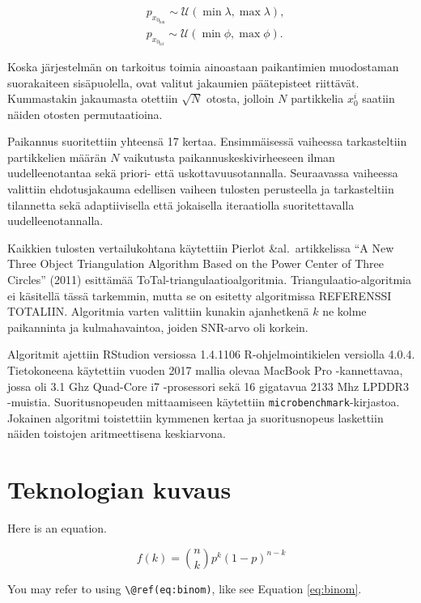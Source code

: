 \documentclass[
  12pt,
  a4paper, twoside]{book}
\begin{document}
\begin{align}
&p_{x_{0_{\text{lon}}}}\sim\mathcal{U}(\min{\lambda},\max{\lambda}),\\
&p_{x_{0_{\text{lat}}}}\sim\mathcal{U}(\min{\phi},\max{\phi}).
\end{align}

\noindent Koska järjestelmän on tarkoitus toimia ainoastaan paikantimien muodostaman suorakaiteen sisäpuolella, ovat valitut jakaumien päätepisteet riittävät. Kummastakin jakaumasta otettiin \(\sqrt{N}\) otosta, jolloin \(N\) partikkelia \(x^i_0\) saatiin näiden otosten permutaatioina.

Paikannus suoritettiin yhteensä 17 kertaa. Ensimmäisessä vaiheessa tarkasteltiin partikkelien määrän \(N\) vaikutusta paikannuskeskivirheeseen ilman uudelleenotantaa sekä priori- että uskottavuusotannalla. Seuraavassa vaiheessa valittiin ehdotusjakauma edellisen vaiheen tulosten perusteella ja tarkasteltiin tilannetta sekä adaptiivisella että jokaisella iteraatiolla suoritettavalla uudelleenotannalla.

Kaikkien tulosten vertailukohtana käytettiin Pierlot \&al.~artikkelissa ``A New Three Object Triangulation Algorithm Based on the Power Center of Three Circles'' (2011) esittämää ToTal-triangulaatioalgoritmia. Triangulaatio-algoritmia ei käsitellä tässä tarkemmin, mutta se on esitetty algoritmissa REFERENSSI TOTALIIN. Algoritmia varten valittiin kunakin ajanhetkenä \(k\) ne kolme paikanninta ja kulmahavaintoa, joiden SNR-arvo oli korkein.

Algoritmit ajettiin RStudion versiossa 1.4.1106 R-ohjelmointikielen versiolla 4.0.4. Tietokoneena käytettiin vuoden 2017 mallia olevaa MacBook Pro -kannettavaa, jossa oli 3.1 Ghz Quad-Core i7 -prosessori sekä 16 gigatavua 2133 Mhz LPDDR3 -muistia. Suoritusnopeuden mittaamiseen käytettiin \texttt{microbenchmark}-kirjastoa. Jokainen algoritmi toistettiin kymmenen kertaa ja suoritusnopeus laskettiin näiden toistojen aritmeettisena keskiarvona.

\section{Teknologian kuvaus}

Here is an equation.

\begin{equation} 
  f\left(k\right) = \binom{n}{k} p^k\left(1-p\right)^{n-k}
  \label{eq:binom}
\end{equation}

You may refer to using \texttt{\textbackslash{}@ref(eq:binom)}, like see Equation \eqref{eq:binom}.
\end{document}
